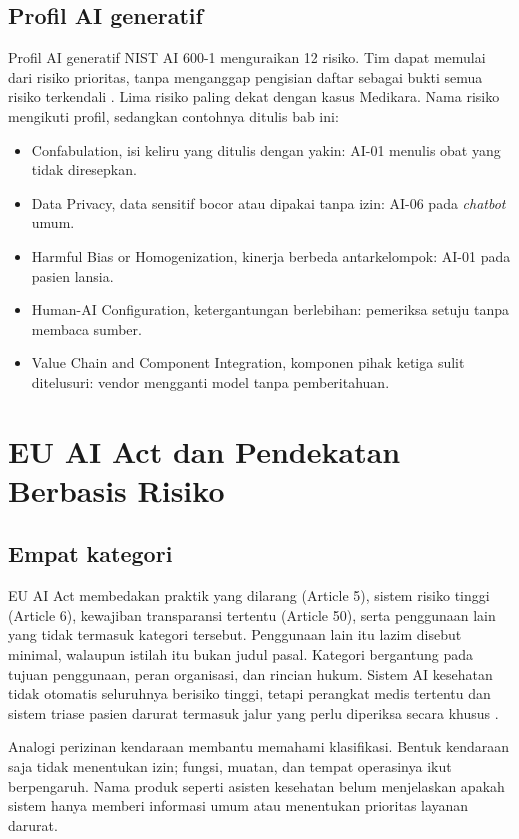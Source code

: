 \subsection*{Profil AI generatif}

Profil AI generatif NIST AI 600-1 menguraikan 12 risiko. Tim dapat memulai dari risiko prioritas,
tanpa menganggap pengisian daftar sebagai bukti semua risiko terkendali \cite{c11-nist-genai}. Lima
risiko paling dekat dengan kasus Medikara. Nama risiko mengikuti profil, sedangkan contohnya ditulis
bab ini:
\begin{itemize}
  \item Confabulation, isi keliru yang ditulis dengan yakin: AI-01 menulis obat yang tidak
  diresepkan.
  \item Data Privacy, data sensitif bocor atau dipakai tanpa izin: AI-06 pada \textit{chatbot} umum.
  \item Harmful Bias or Homogenization, kinerja berbeda antarkelompok: AI-01 pada pasien lansia.
  \item Human-AI Configuration, ketergantungan berlebihan: pemeriksa setuju tanpa membaca sumber.
  \item Value Chain and Component Integration, komponen pihak ketiga sulit ditelusuri: vendor
  mengganti model tanpa pemberitahuan.
\end{itemize}

\section{EU AI Act dan Pendekatan Berbasis Risiko}

\subsection*{Empat kategori}

EU AI Act membedakan praktik yang dilarang (Article 5), sistem risiko tinggi (Article 6), kewajiban
transparansi tertentu (Article 50), serta penggunaan lain yang tidak termasuk kategori tersebut.
Penggunaan lain itu lazim disebut minimal, walaupun istilah itu bukan judul pasal. Kategori
bergantung pada tujuan penggunaan, peran organisasi, dan rincian hukum. Sistem AI kesehatan tidak
otomatis seluruhnya berisiko tinggi, tetapi perangkat medis tertentu dan sistem triase pasien
darurat termasuk jalur yang perlu diperiksa secara khusus \cite{euaiact2024,c11-aiact-explorer}.

Analogi perizinan kendaraan membantu memahami klasifikasi. Bentuk kendaraan saja tidak menentukan
izin; fungsi, muatan, dan tempat operasinya ikut berpengaruh. Nama produk seperti asisten kesehatan
belum menjelaskan apakah sistem hanya memberi informasi umum atau menentukan prioritas layanan
darurat.

